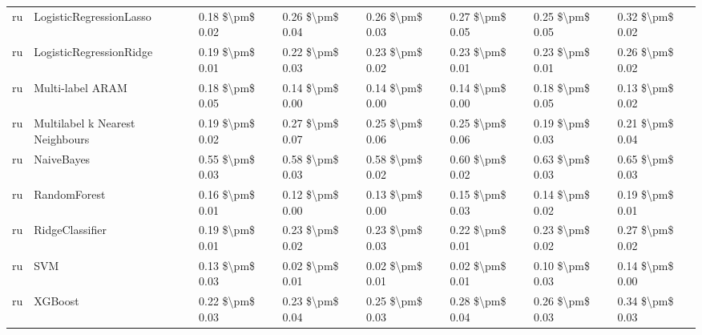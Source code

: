 \begin{tabular}{llllllll}
      ru &         LogisticRegressionLasso &     0.18 \$\textbackslash pm\$ 0.02 &           0.26 \$\textbackslash pm\$ 0.04 &       0.26 \$\textbackslash pm\$ 0.03 &        0.27 \$\textbackslash pm\$ 0.05 &                         0.25 \$\textbackslash pm\$ 0.05 &     0.32 \$\textbackslash pm\$ 0.02 \\
      ru &         LogisticRegressionRidge &     0.19 \$\textbackslash pm\$ 0.01 &           0.22 \$\textbackslash pm\$ 0.03 &       0.23 \$\textbackslash pm\$ 0.02 &        0.23 \$\textbackslash pm\$ 0.01 &                         0.23 \$\textbackslash pm\$ 0.01 &     0.26 \$\textbackslash pm\$ 0.02 \\
      ru &                Multi-label ARAM &     0.18 \$\textbackslash pm\$ 0.05 &           0.14 \$\textbackslash pm\$ 0.00 &       0.14 \$\textbackslash pm\$ 0.00 &        0.14 \$\textbackslash pm\$ 0.00 &                         0.18 \$\textbackslash pm\$ 0.05 &     0.13 \$\textbackslash pm\$ 0.02 \\
      ru & Multilabel k Nearest Neighbours &     0.19 \$\textbackslash pm\$ 0.02 &           0.27 \$\textbackslash pm\$ 0.07 &       0.25 \$\textbackslash pm\$ 0.06 &        0.25 \$\textbackslash pm\$ 0.06 &                         0.19 \$\textbackslash pm\$ 0.03 &     0.21 \$\textbackslash pm\$ 0.04 \\
      ru &                      NaiveBayes &     0.55 \$\textbackslash pm\$ 0.03 &           0.58 \$\textbackslash pm\$ 0.03 &       0.58 \$\textbackslash pm\$ 0.02 &        0.60 \$\textbackslash pm\$ 0.02 &                         0.63 \$\textbackslash pm\$ 0.03 &     0.65 \$\textbackslash pm\$ 0.03 \\
      ru &                    RandomForest &     0.16 \$\textbackslash pm\$ 0.01 &           0.12 \$\textbackslash pm\$ 0.00 &       0.13 \$\textbackslash pm\$ 0.00 &        0.15 \$\textbackslash pm\$ 0.03 &                         0.14 \$\textbackslash pm\$ 0.02 &     0.19 \$\textbackslash pm\$ 0.01 \\
      ru &                 RidgeClassifier &     0.19 \$\textbackslash pm\$ 0.01 &           0.23 \$\textbackslash pm\$ 0.02 &       0.23 \$\textbackslash pm\$ 0.03 &        0.22 \$\textbackslash pm\$ 0.01 &                         0.23 \$\textbackslash pm\$ 0.02 &     0.27 \$\textbackslash pm\$ 0.02 \\
      ru &                             SVM &     0.13 \$\textbackslash pm\$ 0.03 &           0.02 \$\textbackslash pm\$ 0.01 &       0.02 \$\textbackslash pm\$ 0.01 &        0.02 \$\textbackslash pm\$ 0.01 &                         0.10 \$\textbackslash pm\$ 0.03 &     0.14 \$\textbackslash pm\$ 0.00 \\
      ru &                         XGBoost &     0.22 \$\textbackslash pm\$ 0.03 &           0.23 \$\textbackslash pm\$ 0.04 &       0.25 \$\textbackslash pm\$ 0.03 &        0.28 \$\textbackslash pm\$ 0.04 &                         0.26 \$\textbackslash pm\$ 0.03 &     0.34 \$\textbackslash pm\$ 0.03 \\
\bottomrule
\end{tabular}
